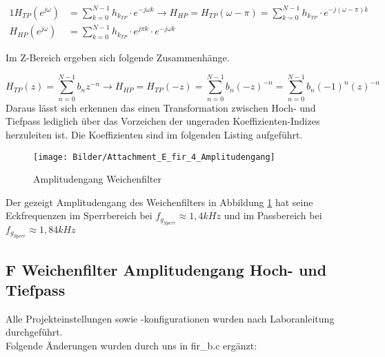 \begin{alignat}{1}
H_{TP}(e^{j\omega})&= \sum_{k=0}^{N-1} h_{k_{TP}} \cdot e^{-j\omega k} \rightarrow H_{HP} = H_{TP}(\omega-\pi)= \sum_{k=0}^{N-1} h_{k_{TP}} \cdot e^{-j(\omega-\pi) k} \\
H_{HP}(e^{j\omega})&= \sum_{k=0}^{N-1} h_{k_{TP}} \cdot e^{j\pi k} \cdot e^{-j \omega k}
\end{alignat}

\noindent Im Z-Bereich ergeben sich folgende Zusammenhänge.

\begin{equation}
H_{TP}(z)= \sum_{n=0}^{N-1} b_{n} z^{-n} \rightarrow H_{HP} = H_{TP}(-z)= \sum_{n=0}^{N-1} b_{n} (-z)^{-n} = \sum_{n=0}^{N-1} b_{n} (-1)^n(z)^{-n}
\end{equation}
Daraus lässt sich erkennen das einen Transformation zwischen  Hoch- und Tiefpass lediglich über das Vorzeichen der ungeraden Koeffizienten-Indizes herzuleiten ist. Die Koeffizienten sind im folgenden Listing aufgeführt.

\newpage



\begin{figure}[H]
\centering
\texttt{[image: Bilder/Attachment\_E\_fir\_4\_Amplitudengang]}
\caption{Amplitudengang Weichenfilter}
\label{fig:Attachment_E_fir_4_Amplitudengang}
\end{figure}

\noindent Der gezeigt Amplitudengang des Weichenfilters in Abbildung \ref{fig:Attachment_E_fir_4_Amplitudengang} hat seine Eckfrequenzen im Sperrbereich bei $f_{g_{Sperr}} \approx 1,4 kHz$ und im Passbereich bei $f_{g_{Sperr}} \approx 1,84 kHz$


\clearpage
\subsection{F Weichenfilter Amplitudengang Hoch- und Tiefpass}
\noindent \noindent Alle Projekteinstellungen sowie -konfigurationen wurden nach Laboranleitung durchgeführt. \\
\noindent Folgende Änderungen wurden durch uns in fir\_b.c ergänzt: \\


\clearpage

